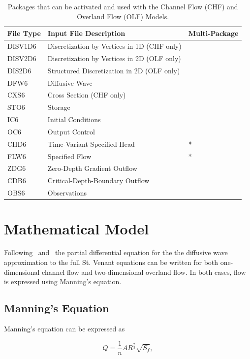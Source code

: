 \documentclass[fleqn]{article}
\begin{document}
\begin{table}[ht]
   \caption{Packages that can be activated and used with the Channel Flow (CHF) and Overland Flow (OLF) Models.}
   \begin{tabular*}{\columnwidth}{l l l}
   \hline
   \hline
   File Type & Input File Description & Multi-Package \\
   \hline
   DISV1D6 & Discretization by Vertices in 1D (CHF only) \\
   DISV2D6 & Discretization by Vertices in 2D (OLF only) \\
   DIS2D6 & Structured Discretization in 2D (OLF only) \\
   DFW6 & Diffusive Wave \\ 
   CXS6 & Cross Section (CHF only) \\ 
   STO6 & Storage \\
   IC6 & Initial Conditions \\
   OC6 & Output Control \\
   CHD6 & Time-Variant Specified Head & * \\
   FLW6 & Specified Flow & * \\
   ZDG6 & Zero-Depth Gradient Outflow &   \\
   CDB6 & Critical-Depth-Boundary Outflow &   \\
   OBS6 & Observations \\
   \hline 
   \end{tabular*}
   \label{table:ftype-swf}
  \end{table}


\section{Mathematical Model}
Following~\cite{panday2004} and~\cite{hughes2012documentation} the partial differential equation for the the diffusive wave approximation to the full St. Venant equations can be written for both one-dimensional channel flow and two-dimensional overland flow.  In both cases, flow is expressed using Manning's equation.

\subsection{Manning's Equation}

Manning's equation can be expressed as

\begin{equation}
  Q = \frac{1}{n} A R^{\frac{2}{3}} \sqrt{S_f},
  \label{eqn:manning}
\end{equation}
\end{document}
